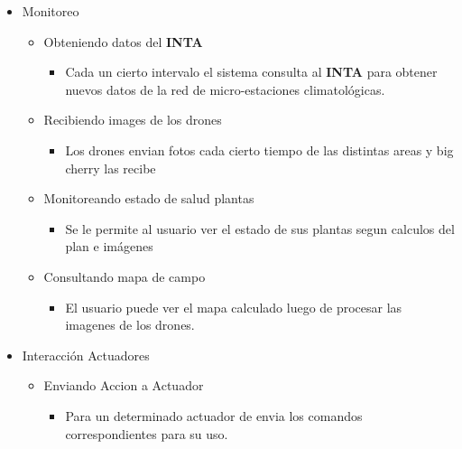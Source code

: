 

\begin{itemize}
 \item Monitoreo
 \begin{itemize}
    \item Obteniendo datos del \textbf{INTA}
    \begin{itemize}
      \item Cada un cierto intervalo el sistema consulta al \textbf{INTA} para obtener nuevos datos de  la red de micro-estaciones climatol\'ogicas.
    \end{itemize}
    \item Recibiendo images de los drones
    \begin{itemize}
	\item Los drones envian fotos cada cierto tiempo de las distintas areas y big cherry las recibe
    \end{itemize}
    \item Monitoreando estado de salud plantas
    \begin{itemize}
	\item Se le permite al usuario ver el estado de sus plantas segun calculos del plan e im\'agenes
    \end{itemize}
    \item Consultando mapa de campo
    \begin{itemize}
	\item El usuario puede ver el mapa calculado luego de procesar las imagenes de los drones.
    \end{itemize}
 \end{itemize}
 \item Interacci\'on Actuadores
 \begin{itemize}
  \item Enviando Accion a Actuador
  \begin{itemize}
   \item Para un determinado actuador de envia los comandos correspondientes para su uso.
  \end{itemize}


\end{itemize}
\end{itemize}
